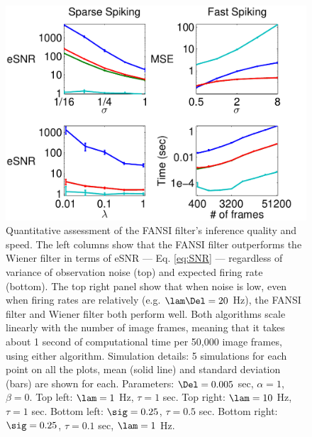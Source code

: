 \begin{figure}[H]
\centering \includegraphics[width=.9\linewidth]{../figs/stats}
\caption{Quantitative assessment of the FANSI filter's inference quality and speed.  The left columns show that the FANSI filter outperforms the Wiener filter in terms of eSNR --- Eq. \eqref{eq:SNR} --- regardless of variance of observation noise (top) and expected firing rate (bottom).  The top right panel show that when noise is low, even when firing rates are relatively (e.g. $\lam \Del=20$ Hz), the FANSI filter and Wiener filter both perform well.  Both algorithms scale linearly with the number of image frames, meaning that it takes about 1 second of computational time per 50,000 image frames, using either algorithm.  %
Simulation details: 5 simulations for each point on all the plots, mean (solid line) and standard deviation (bars) are shown for each.  Parameters: $\Del = 0.005$ sec, $\alpha=1$, $\beta=0$.  Top left: $\lam=1$ Hz, $\tau=1$ sec.  Top right: $\lam=10$ Hz, $\tau=1$ sec.  Bottom left: $\sig=0.25$, $\tau=0.5$ sec.  Bottom right: $\sig=0.25$, $\tau=0.1$ sec, $\lam=1$ Hz.} \label{fig:stats}
\end{figure}


